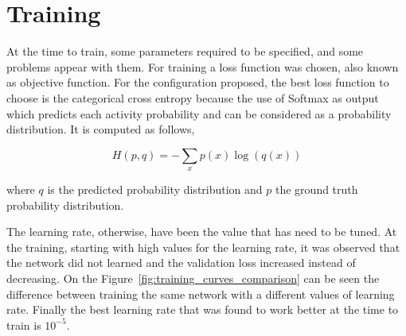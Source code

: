

\section{Training}
\label{section:training}

At the time to train, some parameters required to be specified, and some problems appear with them. For training a loss function was chosen, also known as objective function. For the configuration proposed, the best loss function to choose is the categorical cross entropy because the use of Softmax as output which predicts each activity probability and can be considered as a probability distribution. It is computed as follows,

\begin{equation}
	H(p,q) = - \sum_x p(x) \log(q(x))
\end{equation}

where $q$ is the predicted probability distribution and $p$ the ground truth probability distribution.

The learning rate, otherwise, have been the value that has need to be tuned. At the training, starting with high values for the learning rate, it was observed that the network did not learned and the validation loss increased instead of decreasing. On the Figure~\ref{fig:training_curves_comparison} can be seen the difference between training the same network with a different values of learning rate. Finally the best learning rate that was found to work better at the time to train is $10^{-5}$.

